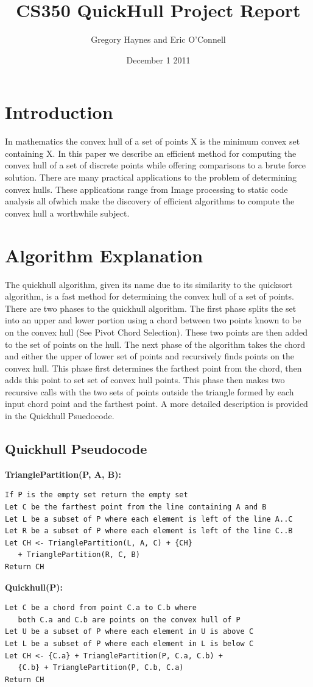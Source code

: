 \documentclass[11pt]{article}
\title{CS350 QuickHull Project Report}
\author{Gregory Haynes and Eric O'Connell}
\date{December 1 2011}
\begin{document}
\maketitle

\section{Introduction}

In mathematics the convex hull of a set of points X is the minimum convex set containing X\cite{Wikipedia:QH}. In this paper we describe an efficient method for computing the convex hull of a set of discrete points while offering comparisons to a brute force solution. There are many practical applications to the problem of determining convex hulls. These applications range from Image processing to static code analysis all ofwhich make the discovery of efficient algorithms to compute the convex hull a worthwhile subject.

\section{Algorithm Explanation}

The quickhull algorithm, given its name due to its similarity to the quicksort algorithm, is a fast method for determining the convex hull of a set of points. There are two phases to the quickhull algorithm. The first phase splits the set into an upper and lower portion using a chord between two points known to be on the convex hull (See Pivot Chord Selection). These two points are then added to the set of points on the hull. The next phase of the algorithm takes the chord and either the upper of lower set of points and recursively finds points on the convex hull. This phase first determines the farthest point from the chord, then adds this point to set set of convex hull points. This phase then makes two recursive calls with the two sets of points outside the triangle formed by each input chord point and the farthest point. A more detailed description is provided in the Quickhull Psuedocode.

\subsection{Quickhull Pseudocode}

\textbf{TrianglePartition(P, A, B):}
\begin{verbatim}
If P is the empty set return the empty set
Let C be the farthest point from the line containing A and B
Let L be a subset of P where each element is left of the line A..C
Let R be a subset of P where each element is left of the line C..B
Let CH <- TrianglePartition(L, A, C) + {CH}
   + TrianglePartition(R, C, B)
Return CH
\end{verbatim}
\textbf{Quickhull(P):}
\begin{verbatim}
Let C be a chord from point C.a to C.b where 
   both C.a and C.b are points on the convex hull of P
Let U be a subset of P where each element in U is above C
Let L be a subset of P where each element in L is below C
Let CH <- {C.a} + TrianglePartition(P, C.a, C.b) + 
   {C.b} + TrianglePartition(P, C.b, C.a)
Return CH
\end{verbatim}
\end{document}
